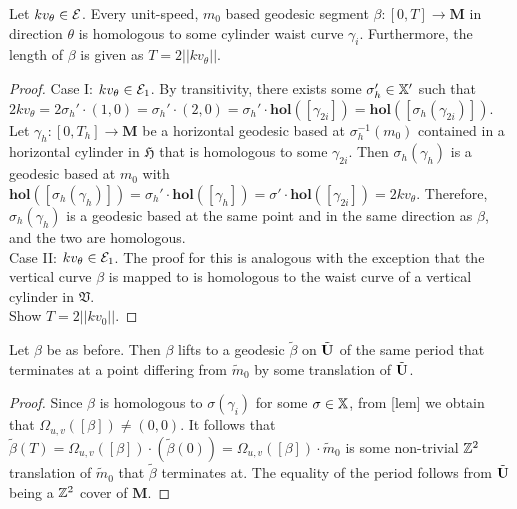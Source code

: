 \documentclass[a4paper, 11pt]{article}
\def\hol{\mathbf{hol}}
\def\bM{\mathbf{M}}
\def\mtild{\tilde{m}_0}
\begin{document}
\begin{thm}
Let $kv_\theta\in\mathcal{E}$. Every unit-speed, $m_0$ based geodesic segment $\beta:[0,T]\rightarrow\bM$ in direction $\theta$ is homologous to some cylinder waist curve $\gamma_i$. Furthermore, the length of $\beta$ is given as $T=2||kv_\theta||$.
\begin{proof}
Case I: $kv_\theta\in\mathcal{E}_1$. By transitivity, there exists some $\sigma_h'\in\mathbb{X}'$ such that $2kv_\theta=2\sigma_h'\cdot(1,0)=\sigma_h'\cdot(2,0)=\sigma_h'\cdot\hol([\gamma_{2i}])=\hol([\sigma_h(\gamma_{2i})])$. Let $\gamma_h:[0,T_h]\rightarrow\bM$ be a horizontal geodesic based at $\sigma_h^{-1}(m_0)$ contained in a horizontal cylinder in $\mathfrak{H}$ that is homologous to some $\gamma_{2i}$. Then $\sigma_h(\gamma_h)$ is a geodesic based at $m_0$ with $\hol([\sigma_h(\gamma_h)])=\sigma_h'\cdot\hol([\gamma_h])=\sigma'\cdot\hol([\gamma_{2i}])=2kv_\theta$. Therefore, $\sigma_h(\gamma_h)$ is a geodesic based at the same point and in the same direction as $\beta$, and the two are homologous.\\
Case II: $kv_\theta\in\mathcal{E}_1$. The proof for this is analogous with the exception that the vertical curve $\beta$ is mapped to is homologous to the waist curve of a vertical cylinder in $\mathfrak{V}$.\\
Show $T=2||kv_0||$.
\end{proof}
\end{thm}

\begin{cor}
Let $\beta$ be as before. Then $\beta$ lifts to a  geodesic $\tilde{\beta}$ on $\tilde{\mathbf{U}}$ of the same period that terminates at a point differing from $\mtild$ by some translation of $\tilde{\mathbf{U}}$.
\begin{proof}
Since $\beta$ is homologous to $\sigma(\gamma_i)$ for some $\sigma\in\mathbb{X}$, from [lem] we obtain that $\Omega_{u,v}([\beta])\neq(0,0)$. It follows that $\tilde{\beta}(T)=\Omega_{u,v}([\beta])\cdot(\tilde{\beta}(0))=\Omega_{u,v}([\beta])\cdot\mtild$ is some non-trivial $\mathbb{Z}^2$ translation of $\mtild$ that $\tilde{\beta}$ terminates at. The equality of the period follows from $\tilde{\mathbf{U}}$ being a $\mathbb{Z}^2$ cover of $\bM$.
\end{proof}
\end{cor}
\end{document}

